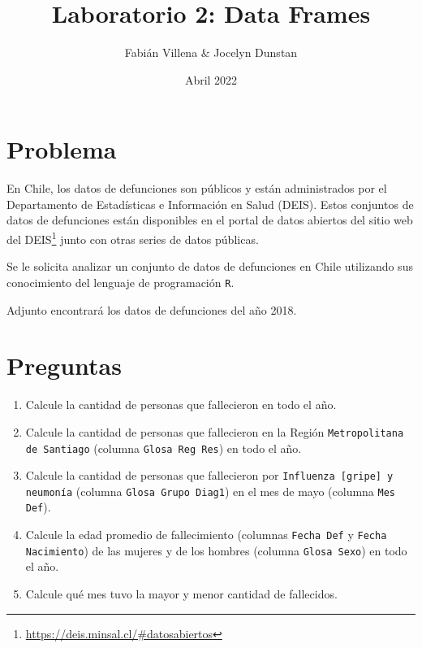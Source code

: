 \documentclass{article}
\title{Laboratorio 2: Data Frames}
\author{Fabián Villena \& Jocelyn Dunstan}
\date{Abril 2022}
\begin{document}
\maketitle

\section{Problema}

En Chile, los datos de defunciones son públicos y están administrados por el Departamento de Estadísticas e Información en Salud (DEIS). Estos conjuntos de datos de defunciones están disponibles en el portal de datos abiertos del sitio web del DEIS\footnote{\url{https://deis.minsal.cl/\#datosabiertos}} junto con otras series de datos públicas.

Se le solicita analizar un conjunto de datos de defunciones en Chile utilizando sus conocimiento del lenguaje de programación \texttt{R}.

Adjunto encontrará los datos de defunciones del año 2018.

\section{Preguntas}

\begin{enumerate}
    \item Calcule la cantidad de personas que fallecieron en todo el año.
    \item Calcule la cantidad de personas que fallecieron en la Región \texttt{Metropolitana de Santiago} (columna \texttt{Glosa Reg Res}) en todo el año.
    \item Calcule la cantidad de personas que fallecieron por \texttt{Influenza [gripe] y neumonía} (columna \texttt{Glosa Grupo Diag1}) en el mes de mayo (columna \texttt{Mes Def}).
    \item Calcule la edad promedio de fallecimiento (columnas \texttt{Fecha Def} y \texttt{Fecha Nacimiento}) de las mujeres y de los hombres (columna \texttt{Glosa Sexo}) en todo el año.
    \item Calcule qué mes tuvo la mayor y menor cantidad de fallecidos.
\end{enumerate}
\end{document}
